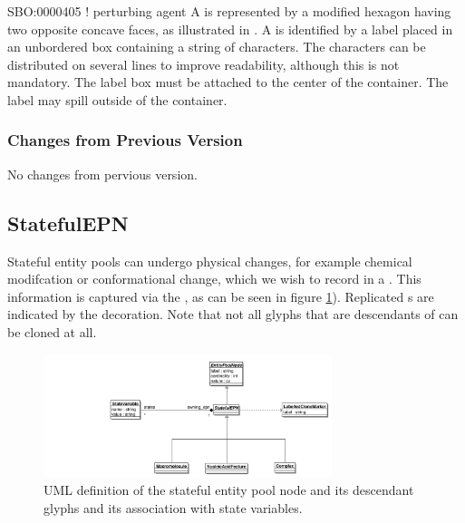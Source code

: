 \begin{glyphDescription}
\glyphSboTerm SBO:0000405 ! perturbing agent
\glyphContainer A  is represented by a modified hexagon
having two opposite concave faces, as illustrated in .
\glyphLabel A  is identified by a label placed in an
unbordered box containing a string of characters.  The characters can be
distributed on several lines to improve readability, although this is not
mandatory.  The label box must be attached to the center of the
 container.  The label may spill outside of the container.
\end{glyphDescription}

\subsubsection{Changes from Previous Version}

No changes from pervious version.

\subsection{StatefulEPN}
\label{defn:StatefulEPN}

Stateful entity pools can undergo physical changes, for example
chemical modifcation or conformational change, which we wish to record
in a \PDm. This information is captured via the
, as can be seen in figure
\ref{fig:statefulepnuml}). Replicated s are
indicated by the  decoration. Note that
not all glyphs that are descendants of  can be
cloned at all.

\begin{figure}[htb]
  \centering
  \includegraphics[width=0.75\textwidth]{images/statefulepnuml}
\caption{UML definition of the stateful entity pool node and its
  descendant glyphs and its association with state variables.}
  \label{fig:statefulepnuml}
\end{figure}

